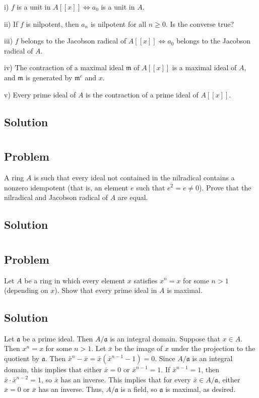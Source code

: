 \documentclass[book,12pt,oneside,openany]{memoir}
\begin{document}
i) $f$ is a unit in $A[[x]] \Leftrightarrow a_0$ is a unit in $A$.

ii) If $f$ is nilpotent, then $a_n$ is nilpotent for all $n \geq 0$. Is the converse true?

iii) $f$ belongs to the Jacobson radical of $A[[x]] \Leftrightarrow a_0$ belongs to the Jacobson radical of $A$.

iv) The contraction of a maximal ideal $\mathfrak{m}$ of $A[[x]]$ is a maximal ideal of $A$, and $\mathfrak{m}$ is generated by $\mathfrak{m}^c$ and $x$.

v) Every prime ideal of $A$ is the contraction of a prime ideal of $A[[x]]$.


\subsection{Solution}

\section{}
\subsection{Problem}
A ring $A$ is such that every ideal not contained in the nilradical contains a nonzero idempotent (that is, an element $e$ such that $e^2 = e \neq 0$). Prove that the nilradical and Jacobson radical of $A$ are equal.
\subsection{Solution}



\section{}
\subsection{Problem}
Let $A$ be a ring in which every element $x$ satisfies $x^n = x$ for some $n > 1$ (depending on $x$). Show that every prime ideal in $A$ is maximal.
\subsection{Solution}
Let $\mathfrak{a}$ be a prime ideal. Then $A/\mathfrak{a}$ is an integral domain. Suppose that $x \in A$. Then $x^n = x$ for some $n > 1$. Let $\bar{x}$ be the image of $x$ under the projection to the quotient by $\mathfrak{a}$. Then $\bar{x}^n - \bar{x} = \bar{x} (\bar{x}^{n-1} - 1) = 0$. Since $A/\mathfrak{a}$ is an integral domain, this implies that either $\bar{x} = 0$ or $\bar{x}^{n-1} = 1$. If $\bar{x}^{n-1} = 1$, then $\bar{x} \cdot \bar{x}^{n-2} = 1$, so $\bar{x}$ has an inverse. This implies that for every $\bar{x} \in A/\mathfrak{a}$, either $\bar{x} = 0$ or $\bar{x}$ has an inverse. Thus, $A/\mathfrak{a}$ is a field, so $\mathfrak{a}$ is maximal, as desired.
\end{document}
